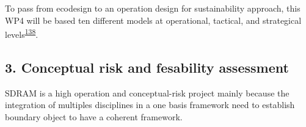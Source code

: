 \documentclass[
  12pt,
  a4paperpaper,
  onecolumn]{article}
\begin{document}
To pass from ecodesign to an operation design for sustainability
approach, this WP4 will be based ten different models at operational,
tactical, and strategical
levels\textsuperscript{\protect\hyperlink{ref-SousaRocha2019}{138}}.

\hypertarget{conceptual-risk-and-fesability-assessment}{%
\subsection{3. Conceptual risk and fesability
assessment}\label{conceptual-risk-and-fesability-assessment}}

SDRAM is a high operation and conceptual-risk project mainly because the
integration of multiples disciplines in a one basis framework need to
establish boundary object to have a coherent framework.

\small
\end{document}

